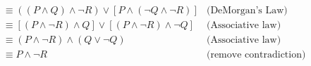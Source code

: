 
\begin{align*}
  &\equiv ((P \land Q) \land \lnot R) \lor [P \land (\lnot Q \land \lnot R)]
    &\textrm{(DeMorgan's Law)}\\
    &\equiv [(P \land \lnot R) \land Q] \lor [(P \land \lnot R) \land \lnot Q]
    &\textrm{(Associative law)}\\
  &\equiv (P \land \lnot R) \land (Q \lor \neg Q)
    &\textrm{(Associative law)}\\
  &\equiv P \land \lnot R &\textrm{(remove contradiction)}
\end{align*}
